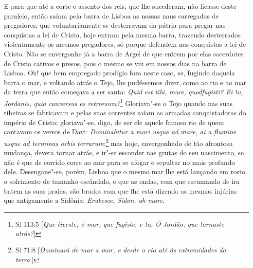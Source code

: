 E para que até a corte e assento dos reis, que lhe sucederam, não
ficasse deste paralelo, então saíam pela barra de Lisboa as nossas naus
carregadas de pregadores, que voluntariamente se desterravam da pátria
para pregar nas conquistas a lei de Cristo, hoje entram pela mesma
barra, trazendo desterrados violentamente os mesmos pregadores, só
porque defendem nas conquistas a lei de Cristo. Não se envergonhe já a
barra de Argel de que entrem por elas sacerdotes de Cristo cativos e
presos, pois o mesmo se viu em nossos dias na barra de Lisboa. Oh! que
bem empregado prodígio fora neste caso, se, fugindo daquela barra o mar,
e voltando atrás o Tejo, lhe pudéssemos dizer, como ao rio e ao mar da
terra que então começava a ser santa: \emph{Quid est tibi, mare,
quodfugisti? Ei tu, Jordanis, quia conversus es retrorsum?}\footnote{Sl 113:5 [\emph{Que tiveste, ó mar, que fugiste, e tu, Ó Jordão, que tornaste atrás?}]}
Gloriava"-se o Tejo quando nas suas ribeiras se fabricavam e pelas suas
correntes saíam as armadas conquistadoras do império de Cristo;
gloriava"-se, digo, de ser ele aquele famoso rio de quem cantavam os
versos de Davi: \emph{Dominabitur a mari usque ad mare, ai a flumine
usque ad terminas orbis terrarum}:\footnote{Sl 71:8 [\emph{Dominará de mar a mar, e desde o rio até às extremidades da terra}.]} mas hoje, envergonhado
de tão afrontosa mudança, devera tornar atrás, e ir"-se esconder nas
grutas do seu nascimento, se não é que de corrido corre ao mar para se
afogar e sepultar no mais profundo dele.
Desengane"-se, porém, Lisboa que o mesmo mar lhe está lançando em rosto o
sofrimento de tamanho escândalo, e que as ondas, com que escumando de
ira batem as suas praias, são brados com que lhe está dizendo as mesmas
injúrias que antigamente a Sidônia: \emph{Erubesce, Sidon, ah mare}.

